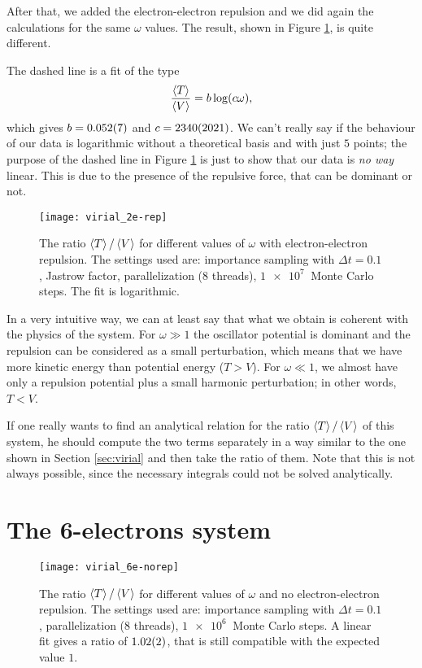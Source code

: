 After that, we added the electron-electron repulsion and we did again the calculations for the same $\omega$ values. The result, shown in Figure \ref{fig:virial_2e-rep}, is quite different.

The dashed line is a fit of the type
\begin{equation}
	\frac{\Braket{T}}{\Braket{V}} = b\log(c\omega),
\end{equation}
which gives $b = \SI{0.052 \pm 0.007}{}$ and $c = \SI{2340 \pm 2021}{}$. We can't really say if the behaviour of our data is logarithmic without a theoretical basis and with just $5$ points; the purpose of the dashed line in Figure \ref{fig:virial_2e-rep} is just to show that our data is \emph{no way} linear. This is due to the presence of the repulsive force, that can be dominant or not.

\begin{figure}[H]
	\centering
	\texttt{[image: virial\_2e-rep]}
	\caption{The ratio $\Braket{T} / \Braket{V}$ for different values of $\omega$ with electron-electron repulsion. The settings used are: importance sampling with $\Delta t = 0.1$, Jastrow factor, parallelization (8 threads), $\SI{1e7}{}$ Monte Carlo steps. The fit is logarithmic.}
	\label{fig:virial_2e-rep}
\end{figure}

In a very intuitive way, we can at least say that what we obtain is coherent with the physics of the system. For $\omega \gg 1$ the oscillator potential is dominant and the repulsion can be considered as a small perturbation, which means that we have more kinetic energy than potential energy ($T > V$). For $\omega \ll 1$, we almost have only a repulsion potential plus a small harmonic perturbation; in other words, $T < V$.

If one really wants to find an analytical relation for the ratio $\Braket{T} / \Braket{V}$ of this system, he should compute the two terms separately in a way similar to the one shown in Section \ref{sec:virial} and then take the ratio of them. Note that this is not always possible, since the necessary integrals could not be solved analytically.


\section{The 6-electrons system}

\begin{figure}[h]%
	\centering
	\texttt{[image: virial\_6e-norep]}
	\caption{The ratio $\Braket{T} / \Braket{V}$ for different values of $\omega$ and no electron-electron repulsion. The settings used are: importance sampling with $\Delta t = 0.1$, parallelization (8 threads), $\SI{1e6}{}$ Monte Carlo steps.
	A linear fit gives a ratio of $\SI{1.02 \pm 0.02}{}$, that is still compatible with the expected value $1$.}
	\label{fig:virial_6e-norep}
\end{figure}

